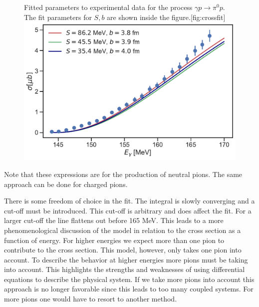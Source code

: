 \begin{figure}[H]
    \begin{sidecaption}{Fitted parameters to experimental data for the process $\gamma p \rightarrow \pi^0 p$. The fit parameters for $S,b$ are shown inside the figure.}[fig:crossfit]
    \includegraphics[width=\linewidth]{Figures/crossfit.pdf}
    \end{sidecaption}
\end{figure}
Note that these expressions are for the production of neutral pions. The same approach can be done for charged pions.

There is some freedom of choice in the fit. The integral is slowly converging and a cut-off must be introduced. This cut-off is arbitrary and does affect the fit. For a larger cut-off the line flattens out before 165 MeV. This leads to a more phenomenological discussion of the model in relation to the cross section as a function of energy. For higher energies we expect more than one pion to contribute to the cross section. This model, however, only takes one pion into account. To describe the behavior at higher energies more pions must be taking into account. This highlights the strengths and weaknesses of using differential equations to describe the physical system. If we take more pions into account this approach is no longer favorable since this leads to too many coupled systems. For more pions one would have to resort to another method.

